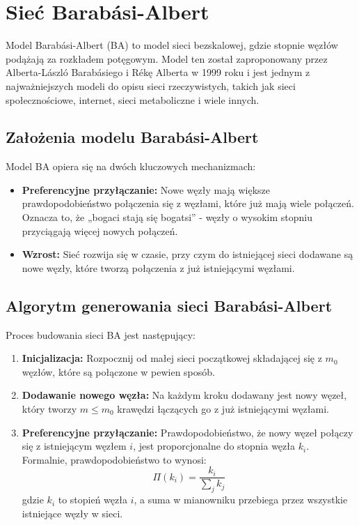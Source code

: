 \section{Sieć Barabási-Albert}
Model Barabási-Albert (BA) to model sieci bezskalowej, gdzie stopnie węzłów podążają za rozkładem potęgowym.
Model ten został zaproponowany przez Alberta-László Barabásiego i Rékę Alberta w 1999 roku \cite{Barabasi1999} i jest jednym z najważniejszych modeli do opisu sieci rzeczywistych,
takich jak sieci społecznościowe, internet, sieci metaboliczne i wiele innych.

\subsection{Założenia modelu Barabási-Albert}
Model BA opiera się na dwóch kluczowych mechanizmach:

\begin{itemize}
      \item \textbf{Preferencyjne przyłączanie:} Nowe węzły mają większe prawdopodobieństwo połączenia się z węzłami, które już mają wiele połączeń.
            \\ Oznacza to, że „bogaci stają się bogatsi” - węzły o wysokim stopniu przyciągają więcej nowych połączeń.
      \item \textbf{Wzrost:} Sieć rozwija się w czasie, przy czym do istniejącej sieci dodawane są nowe węzły, które tworzą połączenia z już istniejącymi węzłami.
\end{itemize}

\subsection{Algorytm generowania sieci Barabási-Albert}
Proces budowania sieci BA jest następujący:

\begin{enumerate}
      \item \textbf{Inicjalizacja:} Rozpocznij od małej sieci początkowej składającej się z $m_0$ węzłów, które są połączone w pewien sposób.
      \item \textbf{Dodawanie nowego węzła:} Na każdym kroku dodawany jest nowy węzeł, który tworzy $m \leq m_0$ krawędzi łączących go z już istniejącymi węzłami.
      \item \textbf{Preferencyjne przyłączanie:} Prawdopodobieństwo, że nowy węzeł połączy się z istniejącym węzłem $i$, jest proporcjonalne do stopnia węzła $k_i$. Formalnie, prawdopodobieństwo to wynosi:
            \begin{equation}
                  \Pi(k_i) = \frac{k_i}{\sum_{j} k_j}
                  \label{eq:preferential-attachment-probability}
            \end{equation}
            gdzie $k_i$ to stopień węzła $i$, a suma w mianowniku przebiega przez wszystkie istniejące węzły w sieci.
\end{enumerate}

